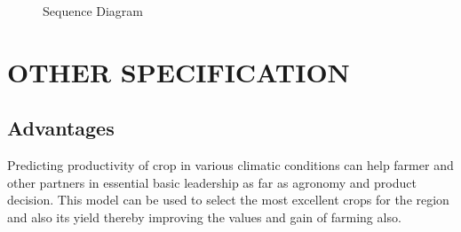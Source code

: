 \documentclass[oneside,a4paper,12pt]{report}
\begin{document}
 \begin{center}
	\begin{figure}[!htbp]
		\centering
	  \caption{Sequence Diagram}
	  \label{fig:class-dig}
	\end{figure}
\end{center}

\chapter{OTHER SPECIFICATION}


\section { Advantages }
\item Predicting productivity of crop in various climatic conditions can help farmer and other partners in essential basic leadership as far as agronomy and product decision. This model can be used to select the most excellent crops for the region and also its yield thereby improving the values and gain of farming also.\\
\end{document}
